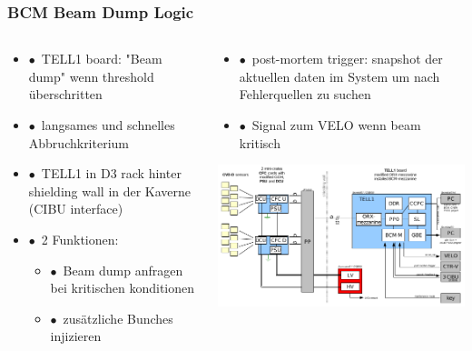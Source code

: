 \documentclass[aspectratio=1610, 12pt, xcolor=dvipsnames]{beamer}
\begin{document}
\begin{frame}\frametitle{BCM Beam Dump Logic}
  \begin{columns}
    \begin{column}[c]{0.48\textwidth}
      \begin{itemize}
        \item $\bullet$\, TELL1 board: "Beam dump" wenn threshold überschritten
        \item $\bullet$\, \to langsames und schnelles Abbruchkriterium
        \item $\bullet$\, TELL1 in D3 rack hinter shielding wall in der Kaverne (CIBU interface)
        \item $\bullet$\, 2 Funktionen:
        \begin{itemize}
          \item $\bullet$\, Beam dump anfragen bei kritischen konditionen
          \item $\bullet$\, zusätzliche Bunches injizieren
        \end{itemize}
      \end{itemize}
    \end{column}
    \begin{column}[c]{0.48\textwidth}
      \begin{itemize}
        \item $\bullet$\, post-mortem trigger: snapshot der aktuellen daten im System um nach Fehlerquellen zu suchen
        \item $\bullet$\, Signal zum VELO wenn beam kritisch
      \end{itemize}
      \includegraphics[width=\textwidth]{plots/bcmReadout.png}
    \end{column}
  \end{columns}
\end{frame}
\end{document}
